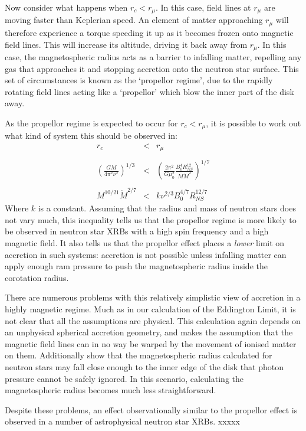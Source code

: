 \par Now consider what happens when $r_c<r_\mu$.  In this case, field lines at $r_\mu$ are moving faster than Keplerian speed.  An element of matter approaching $r_\mu$ will therefore experience a torque speeding it up as it becomes frozen onto magnetic field lines.  This will increase its altitude, driving it back away from $r_\mu$.  In this case, the magnetospheric radius acts as a barrier to infalling matter, repelling any gas that approaches it and stopping accretion onto the neutron star surface.  This set of circumstances is known as the `propellor regime', due to the rapidly rotating field lines acting like a `propellor' which blow the inner part of the disk away.
\par As the propellor regime is expected to occur for $r_c<r_\mu$, it is possible to work out what kind of system this should be observed in:
\begin{eqnarray}
r_c&<&r_\mu\\ \nonumber \\
\left(\frac{GM}{4\pi^2\nu^2}\right)^{1/3}&<&\left(\frac{2\pi^2}{G\mu_0^2}\frac{B_0^4R_{NS}^{12}}{M\dot{M}^2}\right)^{1/7}\\ \nonumber \\
M^{10/21}\dot{M}^{2/7}&<&k\nu^{2/3}B_0^{4/7}R_{NS}^{12/7}
\end{eqnarray}
Where $k$ is a constant.  Assuming that the radius and mass of neutron stars does not vary much, this inequality tells us that the propellor regime is more likely to be observed in neutron star XRBs with a high spin frequency and a high magnetic field.  It also tells us that the propellor effect places a \textit{lower} limit on accretion in such systems: accretion is not possible unless infalling matter can apply enough ram pressure to push the magnetospheric radius inside the corotation radius.
\par There are numerous problems with this relatively simplistic view of accretion in a highly magnetic regime.  Much as in our calculation of the Eddington Limit, it is not clear that all the assumptions are physical.  This calculation again depends on an unphysical spherical accretion geometry, and makes the assumption that the magnetic field lines can in no way be warped by the movement of ionised matter on them.  Additionally \citet{White_MRad} show that the magnetospheric radius calculated for neutron stars may fall close enough to the inner edge of the disk that photon pressure cannot be safely ignored.  In this scenario, calculating the magnetospheric radius becomes much less straightforward.
\par Despite these problems, an effect observationally similar to the propellor effect is observed in a number of astrophysical neutron star XRBs. xxxxx

